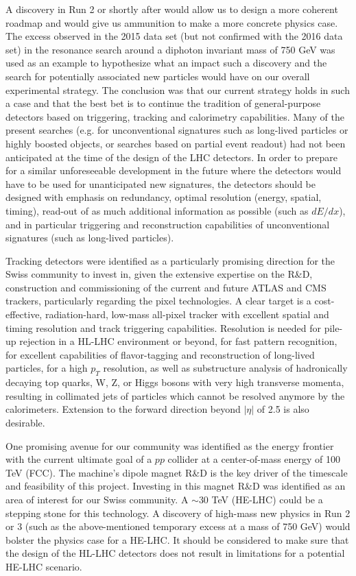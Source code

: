 A discovery in Run 2 or shortly after would allow us to design a more coherent roadmap and would give us ammunition to make a more concrete physics case.  The excess observed in the 2015 data set (but not confirmed with the 2016 data set) in the resonance search around a diphoton invariant mass of 750 GeV was used as an example to hypothesize what an impact such a discovery and the search for potentially associated new particles would have on our overall experimental strategy.  The conclusion was that our current strategy holds in such a case and that the best bet is to continue the tradition of general-purpose detectors based on triggering, tracking and calorimetry capabilities.  Many of the present searches (e.g. for unconventional signatures such as long-lived particles or highly boosted objects, or searches based on partial event readout) had not been anticipated at the time of the design of the LHC detectors.  In order to prepare for a similar unforeseeable development in the future where the detectors would have to be used for unanticipated new signatures, the detectors should be designed with emphasis on redundancy, optimal resolution (energy, spatial, timing), read-out of as much additional information as possible (such as $dE/dx$), and in particular triggering and reconstruction capabilities of unconventional signatures (such as long-lived particles).

Tracking detectors were identified as a particularly promising direction for the Swiss community to invest in, given the extensive expertise on the R\&D, construction and commissioning of the current and future ATLAS and CMS trackers, particularly regarding the pixel technologies.  A clear target is a cost-effective, radiation-hard, low-mass all-pixel tracker with excellent spatial and timing resolution and track triggering capabilities.  Resolution is needed for pile-up rejection in a HL-LHC environment or beyond, for fast pattern recognition, for excellent capabilities of flavor-tagging and reconstruction of long-lived particles, for a high $p_T$ resolution, as well as substructure analysis of hadronically decaying top quarks, W, Z, or Higgs bosons with very high transverse momenta, resulting in collimated jets of particles which cannot be resolved anymore by the calorimeters.  Extension to the forward direction beyond $|\eta |$ of 2.5 is also desirable.

One promising avenue for our community was identified as the energy frontier with the current ultimate goal of a $pp$ collider at a center-of-mass energy of 100 TeV (FCC).  The machine's dipole magnet R\&D is the key driver of the timescale and feasibility of this project.  Investing in this magnet R\&D was identified as an area of interest for our Swiss community.  A $\sim30$ TeV (HE-LHC) could be a stepping stone for this technology.  A discovery of high-mass new physics in Run 2 or 3 (such as the above-mentioned temporary excess at a mass of 750 GeV) would bolster the physics case for a HE-LHC. It should be considered to make sure that the design of the HL-LHC detectors does not result in limitations for a potential HE-LHC scenario.

